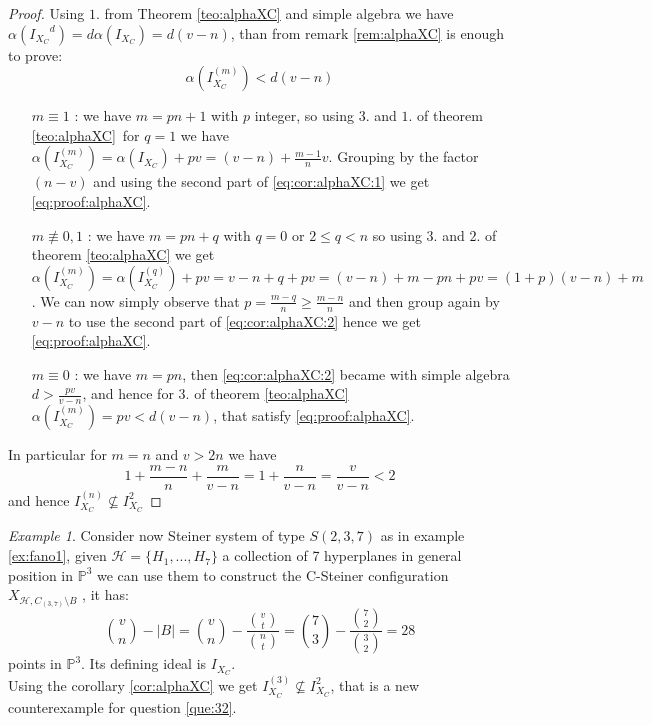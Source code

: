 \documentclass[notitlepage, a4]{book}
\theoremstyle{plain}
\theoremstyle{remark}
\newtheorem{ex}[rem]{Example}
\theoremstyle{definition}
\newcommand{\PP}{\mathbb{P}}
\newcommand{\HH}{\mathcal{H}}
\DeclareMathOperator*{\eqb }{=}
\newcounter{que}
\begin{document}
 \begin{proof}
 Using $ 1. $ from Theorem \ref{teo:alphaXC} and simple algebra we have $ \alpha({I_{X_C}}^d) = d\alpha(I_{X_C}) = d(v- n) $, than from remark \ref{rem:alphaXC} is enough to prove:
 \begin{equation}\label{eq:proof:alphaXC}
 \alpha(I_{X_C}^{(m)}) < d(v-n)
 \end{equation}
 \begin{itemize}
 \item[$m \equiv 1$ : ] we have $ m = pn + 1 $ with $ p $ integer, so using $ 3. $ and $ 1. $ of theorem \ref{teo:alphaXC} for $ q = 1 $ we have $  \alpha(I_{X_C}^{(m)}) \eqb \alpha(I_{X_C} ) + pv \eqb (v-n) + \frac{m-1}{n}v  $. Grouping by the factor $ (n-v) $ and using the second part of \ref{eq:cor:alphaXC:1} we get \ref{eq:proof:alphaXC}. 
 \item[$m \not\equiv 0,1$ : ] we have $ m = pn + q $ with $ q = 0 $ or $ 2 \leq q < n $ so using $ 3. $ and $ 2. $ of theorem \ref{teo:alphaXC} we get  $  \alpha(I_{X_C}^{(m)}) \eqb \alpha(I_{X_C}^{(q)} ) + pv \eqb v - n + q  +pv = (v - n) + m -pn +pv = (1 + p)(v - n) + m $. We can now simply observe that $ p = \frac{m-q}{n} \geq \frac{m-n}{n} $ and then group again by $ v-n $ to use the second part of \ref{eq:cor:alphaXC:2} hence we get \ref{eq:proof:alphaXC}.
 \item[$ m\equiv 0 $ : ] we have $ m=pn $, then \ref{eq:cor:alphaXC:2} became with simple algebra $ d > \frac{pv}{v-n} $, and hence for $ 3. $ of theorem \ref{teo:alphaXC} $  \alpha(I_{X_C}^{(m)})= pv < d(v-n)$, that satisfy \ref{eq:proof:alphaXC}. 
 \end{itemize}
 In particular for $ m=n $ and $ v > 2n $ we have 
 \[ 1 +\frac{ m - n }{ n } + \frac{ m }{ v - n } = 1 + \frac{ n }{ v - n }= \frac{ v }{ v - n } < 2 \]
 and hence $ I_{X_C}^{(n)} \not \subseteq I_{X_C}^2  $
 \end{proof}
 
 \begin{ex}\label{ex:fano2}
 Consider now Steiner system of type $ S(2,3,7) $ as in example \ref{ex:fano1}, given $ \HH = \{ H_1 , ... , H_7 \} $ a collection of 7 hyperplanes in general position in $ \PP^3 $ we can use them to construct the C-Steiner configuration $ X_{\HH , C_{(3,7)} \setminus B} $ , it has:
 \[
 \binom{v}{n} - |B| = \binom{v}{n} -  \frac{\binom{v}{t}}{\binom{n}{t}} = \binom{7}{3} -  \frac{\binom{7}{2}}{\binom{3}{2}} = 28
 \]
 points in $ \PP^3 $. Its defining ideal is  $ I_{X_C} $. \\
 Using the corollary \ref{cor:alphaXC} we get $ I_{X_C}^{(3)}  \not \subseteq I_{X_C}^2$, that is a new counterexample for question \ref{que:32}. 
 \end{ex}
 
\end{document}
